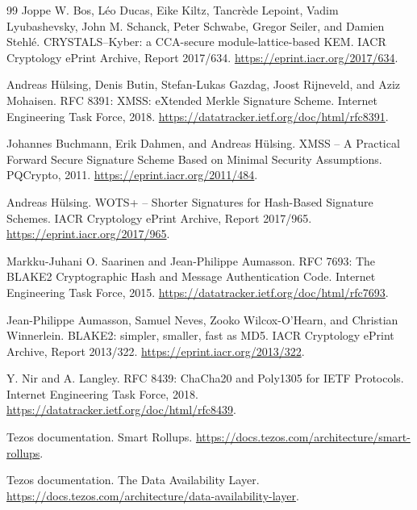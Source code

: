 \documentclass[11pt]{article}
\begin{document}
\begin{thebibliography}{99}
Joppe W. Bos, L\'eo Ducas, Eike Kiltz, Tancr\`ede Lepoint,
Vadim Lyubashevsky, John M. Schanck, Peter Schwabe, Gregor Seiler,
and Damien Stehl\'e.
\newblock CRYSTALS--Kyber: a CCA-secure module-lattice-based KEM.
\newblock IACR Cryptology ePrint Archive, Report 2017/634.
\newblock \url{https://eprint.iacr.org/2017/634}.

Andreas H\"ulsing, Denis Butin, Stefan-Lukas Gazdag, Joost Rijneveld,
and Aziz Mohaisen.
\newblock RFC 8391: XMSS: eXtended Merkle Signature Scheme.
\newblock Internet Engineering Task Force, 2018.
\newblock \url{https://datatracker.ietf.org/doc/html/rfc8391}.

Johannes Buchmann, Erik Dahmen, and Andreas H\"ulsing.
\newblock XMSS -- A Practical Forward Secure Signature Scheme Based on Minimal
Security Assumptions.
\newblock PQCrypto, 2011.
\newblock \url{https://eprint.iacr.org/2011/484}.

Andreas H\"ulsing.
\newblock WOTS+ -- Shorter Signatures for Hash-Based Signature Schemes.
\newblock IACR Cryptology ePrint Archive, Report 2017/965.
\newblock \url{https://eprint.iacr.org/2017/965}.

Markku-Juhani O. Saarinen and Jean-Philippe Aumasson.
\newblock RFC 7693: The BLAKE2 Cryptographic Hash and Message Authentication
Code.
\newblock Internet Engineering Task Force, 2015.
\newblock \url{https://datatracker.ietf.org/doc/html/rfc7693}.

Jean-Philippe Aumasson, Samuel Neves, Zooko Wilcox-O'Hearn, and
Christian Winnerlein.
\newblock BLAKE2: simpler, smaller, fast as MD5.
\newblock IACR Cryptology ePrint Archive, Report 2013/322.
\newblock \url{https://eprint.iacr.org/2013/322}.

Y. Nir and A. Langley.
\newblock RFC 8439: ChaCha20 and Poly1305 for IETF Protocols.
\newblock Internet Engineering Task Force, 2018.
\newblock \url{https://datatracker.ietf.org/doc/html/rfc8439}.

Tezos documentation.
\newblock Smart Rollups.
\newblock \url{https://docs.tezos.com/architecture/smart-rollups}.

Tezos documentation.
\newblock The Data Availability Layer.
\newblock \url{https://docs.tezos.com/architecture/data-availability-layer}.

\end{thebibliography}
\end{document}
